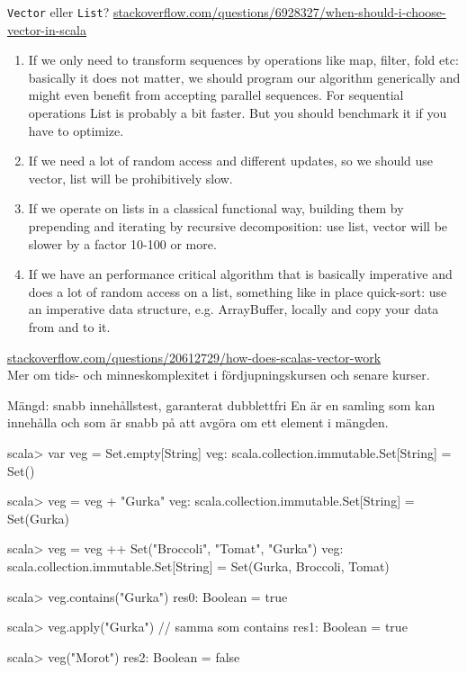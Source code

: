\begin{Slide}{\texttt{Vector} eller \texttt{List}?}\SlideFontTiny
{\href{http://stackoverflow.com/questions/6928327/when-should-i-choose-vector-in-scala}{stackoverflow.com/questions/6928327/when-should-i-choose-vector-in-scala}}

\begin{enumerate}
\item If we only need to transform sequences by operations like map, filter, fold etc: basically it does not matter, we should program our algorithm generically and might even benefit from accepting parallel sequences. For sequential operations List is probably a bit faster. But you should benchmark it if you have to optimize.

\item If we need a lot of random access and different updates, so we should use vector, list will be prohibitively slow.

\item If we operate on lists in a classical functional way, building them by prepending and iterating by recursive decomposition: use list, vector will be slower by a factor 10-100 or more.

\item If we have an performance critical algorithm that is basically imperative and does a lot of random access on a list, something like in place quick-sort: use an imperative data structure, e.g. ArrayBuffer, locally and copy your data from and to it.
\end{enumerate}
{\href{http://stackoverflow.com/questions/20612729/how-does-scalas-vector-work}{stackoverflow.com/questions/20612729/how-does-scalas-vector-work}}\\
Mer om tids- och minneskomplexitet i fördjupningskursen och senare kurser.
\end{Slide}



\begin{Slide}{Mängd: snabb innehållstest, garanterat dubblettfri}\SlideFontSmall
En   är en samling som  kan innehålla  och som är snabb på att avgöra om ett element  i mängden.

\begin{REPL}
scala> var veg = Set.empty[String]
veg: scala.collection.immutable.Set[String] = Set()

scala> veg = veg + "Gurka"
veg: scala.collection.immutable.Set[String] = Set(Gurka)

scala> veg = veg ++ Set("Broccoli", "Tomat", "Gurka")
veg: scala.collection.immutable.Set[String] = Set(Gurka, Broccoli, Tomat)

scala> veg.contains("Gurka")
res0: Boolean = true

scala> veg.apply("Gurka")   // samma som contains
res1: Boolean = true

scala> veg("Morot")
res2: Boolean = false
\end{REPL}

\end{Slide}

